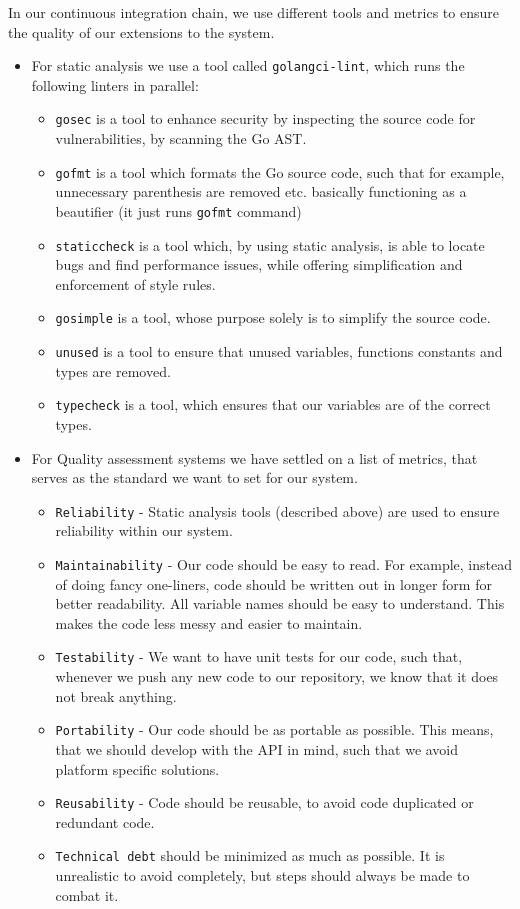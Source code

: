 In our continuous integration chain, we use different tools and metrics to ensure the quality of our extensions to the system.
\begin{itemize}
    \item For static analysis we use a tool called \texttt{golangci-lint}, which runs the following linters in parallel:
    \begin{itemize}
        \item \texttt{gosec} is a tool to enhance security by inspecting the source code for vulnerabilities, by scanning the Go AST.
        \item \texttt{gofmt} is a tool which formats the Go source code, such that for example, unnecessary parenthesis are removed etc. basically functioning as a beautifier (it just runs \texttt{gofmt} command)
        \item \texttt{staticcheck} is a tool which, by using static analysis, is able to locate bugs and find performance issues, while offering simplification and enforcement of style rules.
        \item \texttt{gosimple} is a tool, whose purpose solely is to simplify the source code.
        \item \texttt{unused} is a tool to ensure that unused variables, functions constants and types are removed.
        \item \texttt{typecheck} is a tool, which ensures that our variables are of the correct types.
    \end{itemize}
    \item For Quality assessment systems we have settled on a list of metrics, that serves as the standard we want to set for our system.
    \begin{itemize}
        \item \texttt{Reliability} - Static analysis tools (described above) are used to ensure reliability within our system.
        \item \texttt{Maintainability} - Our code should be easy to read. For example, instead of doing fancy one-liners, code should be written out in longer form for better readability. All variable names should be easy to understand. This makes the code less messy and easier to maintain.
        \item \texttt{Testability} - We want to have unit tests for our code, such that, whenever we push any new code to our repository, we know that it does not break anything.
        \item \texttt{Portability} - Our code should be as portable as possible. This means, that we should develop with the API in mind, such that we avoid platform specific solutions.
        \item \texttt{Reusability} - Code should be reusable, to avoid code duplicated or redundant code. 
        \item \texttt{Technical debt} should be minimized as much as possible. It is unrealistic to avoid completely, but steps should always be made to combat it. 
        

\end{itemize}
\end{itemize}
